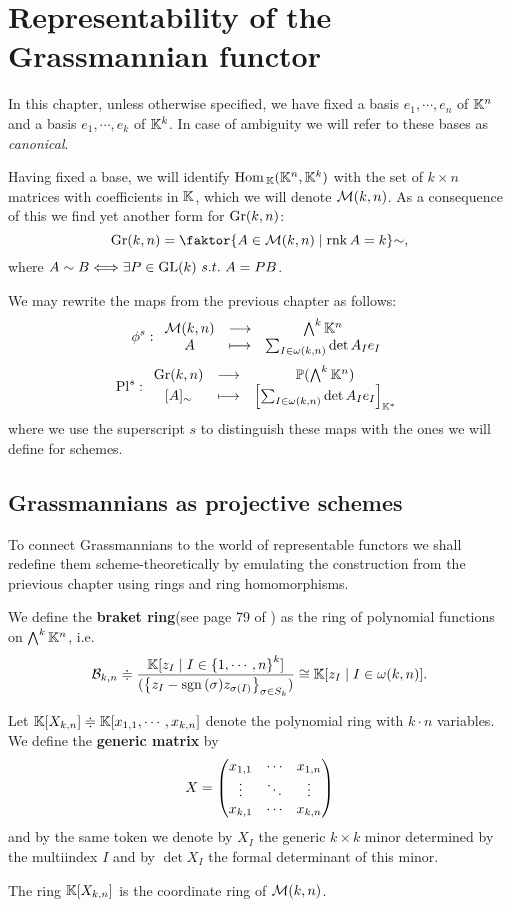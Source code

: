 \chapter{Representability of the Grassmannian functor}
In this chapter, unless otherwise specified, we have fixed a basis $e_1,\cdots, e_n$ of $\mathbb{K}^n$ and a basis $e_1,\cdots, e_k$ of $\mathbb{K}^k$. In case of ambiguity we will refer to these bases as \textit{canonical}.
\medskip

\noindent Having fixed a base, we will identify $\mathrm{Hom}\,_{\mathbb{K}}(\mathbb{K}^n,\mathbb{K}^k)$ with the set of $k\times n$ matrices with coefficients in $\mathbb{K}$, which we will denote $\mathcal{M}(k,n)$. As a consequence of this we find yet another form for $\mathrm{Gr}(k,n)$:
\[\Gr(k,n)=\quot{\cpa{A\in \Mc(k,n)\mid \rnk A=k}}{\sim},\] 
where $A\sim B\Longleftrightarrow \exists P\in \mathrm{GL}(k)\ s.t.\ A=PB$.
\bigskip

\noindent We may rewrite the maps from the previous chapter as follows:
\[\phi^s:\begin{array}{ccc} {\mathcal{M}(k,n)} & \longrightarrow & {\bigwedge^k\mathbb{K}^n}\\ {A} & \longmapsto & {\sum_{I\in \omega(k,n)}\det A_I e_I} \end{array}\]
\[\mathrm{Pl}^s:\begin{array}{ccc} {\mathrm{Gr}(k,n)} & \longrightarrow & {\mathbb{P}(\bigwedge^k\mathbb{K}^n)}\\ {[A]_\sim} & \longmapsto & {\left[{\sum_{I\in \omega(k,n)}\det A_I e_I}\right]_{\mathbb{K}^\ast}} \end{array}\]
where we use the superscript $s$ to distinguish these maps with the ones we will define for schemes.

\section{Grassmannians as projective schemes}
To connect Grassmannians to the world of representable functors we shall redefine them scheme-theoretically by emulating the construction from the prievious chapter using rings and ring homomorphisms.

\begin{definition}
We define the \textbf{braket ring}(see page 79 of \cite{matroids}) as the ring of polynomial functions on $\bigwedge^k\mathbb{K}^n$, i.e.
\[\mathcal{B}_{k,n}\doteqdot\frac{\mathbb{K}[z_I\mid I\in \left\{{1,\cdots, n}\right\}^k]}{(\left\{{z_I-\mathrm{sgn}\,(\sigma)z_{\sigma(I)}}\right\}_{\sigma\in S_k})}\cong \mathbb{K}[z_I\mid I\in \omega(k,n)].\]
\end{definition}

\begin{definition}
Let $\mathbb{K}[X_{k,n}]\doteqdot\mathbb{K}[x_{1,1},\cdots,x_{k,n}]$ denote the polynomial ring with $k\cdot n$ variables. We define the \textbf{generic matrix} by
\[X=\begin{pmatrix}
    x_{1,1} & \cdots & x_{1,n}\\
    \vdots & \ddots & \vdots\\
    x_{k,1} &\cdots & x_{k,n}\end{pmatrix}\]
and by the same token we denote by $X_I$ the generic $k\times k$ minor determined by the multiindex $I$ and by $\det X_I$ the formal determinant of this minor.
\end{definition}
\begin{remark}
The ring $\mathbb{K}[X_{k,n}]$ is the coordinate ring of $\mathcal{M}(k,n)$. 
\end{remark}

